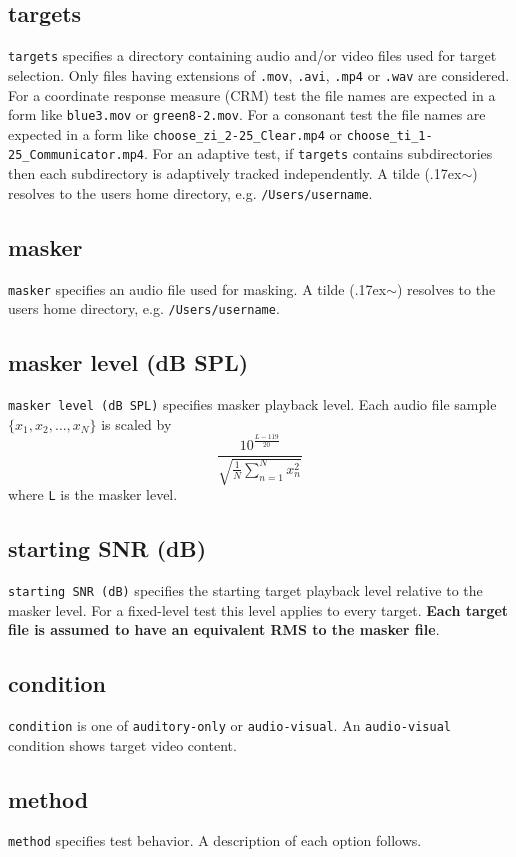 \documentclass[11pt,pdftex,letterpaper]{article}
\newcommand{\mytilde}{\raise.17ex\hbox{$\scriptstyle\mathtt{\sim}$}}
\begin{document}
\subsection{targets}
\texttt{targets} specifies a directory containing audio and/or video files used for target selection. Only files having extensions of \texttt{.mov}, \texttt{.avi}, \texttt{.mp4} or \texttt{.wav} are considered. For a coordinate response measure (CRM) test the file names are expected in a form like \texttt{blue3.mov} or \texttt{green8-2.mov}. For a consonant test the file names are expected in a form like \texttt{choose\_zi\_2-25\_Clear.mp4} or \texttt{choose\_ti\_1-25\_Communicator.mp4}. For an adaptive test, if \texttt{targets} contains subdirectories then each subdirectory is adaptively tracked independently. A tilde (\mytilde) resolves to the users home directory, e.g. \texttt{/Users/username}.
\subsection{masker}
\texttt{masker} specifies an audio file used for masking. A tilde (\mytilde) resolves to the users home directory, e.g. \texttt{/Users/username}.
\subsection{masker level (dB SPL)}
\texttt{masker level (dB SPL)} specifies masker playback level. Each audio file sample ${\displaystyle \{x_{1}, x_{2}, \dots , x_{N}\}}$ is scaled by
\begin{equation}
 \frac{10^{\frac{L-119}{20}}}{\sqrt{\frac{1}{N}\sum_{n=1}^{N}x_{n}^{2}}}\label{eq:masker-scale}
\end{equation}
where \texttt{L} is the masker level.
\subsection{starting SNR (dB)}
\texttt{starting SNR (dB)} specifies the starting target playback level relative to the masker level. For a fixed-level test this level applies to every target. \textbf{Each target file is assumed to have an equivalent RMS to the masker file}.
\subsection{condition}
\texttt{condition} is one of \texttt{auditory-only} or \texttt{audio-visual}. An \texttt{audio-visual} condition shows target video content.
\subsection{method}
\texttt{method} specifies test behavior. A description of each option follows.
\end{document}

